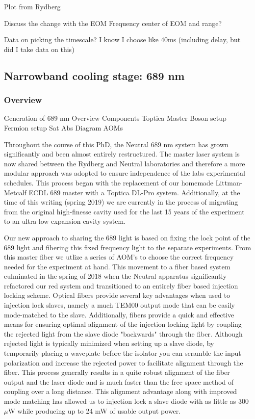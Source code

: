 Plot from Rydberg

Discuss the change with the EOM
	Frequency center of EOM and range?
	
Data on picking the timescale?
	I know I choose like 40ms (including delay, but did I take data on this)


\subsection{Narrowband cooling stage: 689 nm} \label{ssec:689sys}
\subsubsection{Overview}

Generation of 689 nm
	Overview
	Components
		Toptica Master
		Boson setup
		Fermion setup
		Sat Abs
	Diagram
		AOMs
	
Throughout the course of this PhD, the Neutral 689 nm system has grown significantly and been almost entirely restructured. The master laser system is now shared between the Rydberg and Neutral laboratories and therefore a more modular approach was adopted to ensure independence of the labs experimental schedules. This process began with the replacement of our homemade Littman-Metcalf ECDL 689 master with a Toptica DL-Pro system. Additionally, at the time of this writing (spring 2019) we are currently in the process of migrating from the original high-finesse cavity used for the last 15 years \cite{Nagel2004} of the experiment to an ultra-low expansion cavity system. 

Our new approach to sharing the 689 light is based on fixing the lock point of the 689 light and fibering this fixed frequency light to the separate experiments. From this master fiber we utlize a series of AOM's to choose the correct frequency needed for the experiment at hand. This movement to a fiber based system culminated in the spring of 2018 when the Neutral apparatus significantly refactored our red system and transitioned to an entirely fiber based injection locking scheme. Optical fibers provide several key advantages when used to injection lock slaves, namely a much TEM00 output mode that can be easily mode-matched to the slave. Additionally, fibers provide a quick and effective means for ensuring optimal alignment of the injection locking light by coupling the rejected light from the slave diode "backwards" through the fiber. Although rejected light is typically minimized when setting up a slave diode, by temporarily placing a waveplate before the isolator you can scramble the input polarization and increase the rejected power to facilitate alignment through the fiber. This process generally results in a quite robust alignment of the fiber output and the laser diode and is much faster than the free space method of coupling over a long distance. This alignment advantage along with improved mode matching has allowed us to injection lock a slave diode with as little as 300 $\mu$W while producing up to 24 mW of usable output power.

